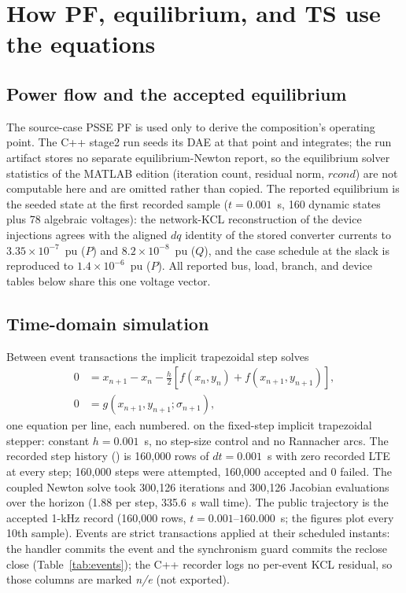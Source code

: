 \documentclass[12pt,a4paper]{article}
\newcommand{\code}[1]{\texttt{\detokenize{#1}}}
\begin{document}
\section{How PF, equilibrium, and TS use the equations}\label{sec:tsform}

\subsection{Power flow and the accepted equilibrium}

The source-case PSSE PF is used only to derive the composition's operating
point.  The C++ stage2 run seeds its DAE at that point and integrates; the run
artifact stores no separate equilibrium-Newton report, so the equilibrium
solver statistics of the MATLAB edition (iteration count, residual norm,
$rcond$) are not computable here and are omitted rather than copied.  The
reported equilibrium is the seeded state at the first recorded sample
($t=0.001$~s, 160 dynamic states plus 78 algebraic voltages): the network-KCL
reconstruction of the device injections agrees with the aligned $dq$ identity
of the stored converter currents to $3.35\times10^{-7}$~pu ($P$) and
$8.2\times10^{-8}$~pu ($Q$), and the case schedule at the slack is reproduced
to $1.4\times10^{-6}$~pu ($P$).  All reported bus, load, branch, and device
tables below share this one voltage vector.

\subsection{Time-domain simulation}

Between event transactions the implicit trapezoidal step solves
\begin{align}
0&=x_{n+1}-x_n-\frac{h}{2}\left[f(x_n,y_n)+f(x_{n+1},y_{n+1})\right],\\
0&=g(x_{n+1},y_{n+1};\sigma_{n+1}),
\end{align}
one equation per line, each numbered.
on the fixed-step implicit trapezoidal stepper: constant $h=0.001$~s, no
step-size control and no Rannacher arcs.  The recorded step history
(\code{ts\_dt\_history.csv}) is 160{,}000 rows of $dt=0.001$~s with zero
recorded LTE at every step; 160{,}000 steps were attempted, 160{,}000 accepted
and 0 failed.  The coupled Newton solve took 300{,}126 iterations and
300{,}126 Jacobian evaluations over the horizon (1.88 per step, 335.6~s wall
time).  The public trajectory is the accepted 1-kHz record (160{,}000 rows,
$t=0.001$--$160.000$~s; the figures plot every 10th sample).  Events are
strict transactions applied at their scheduled instants: the handler commits
the event and the synchronism guard commits the reclose close
(Table~\ref{tab:events}); the C++ recorder logs no per-event KCL residual, so
those columns are marked \emph{n/e} (not exported).
\end{document}
